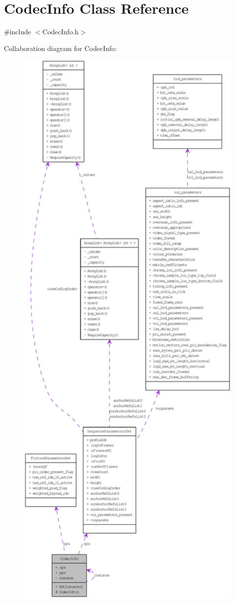 \hypertarget{class_codec_info}{
\section{CodecInfo Class Reference}
\label{class_codec_info}
}


{\ttfamily \#include $<$CodecInfo.h$>$}



Collaboration diagram for CodecInfo:\nopagebreak
\begin{figure}[H]
\begin{center}
\leavevmode
\includegraphics[width=400pt]{class_codec_info__coll__graph}
\end{center}
\end{figure}
